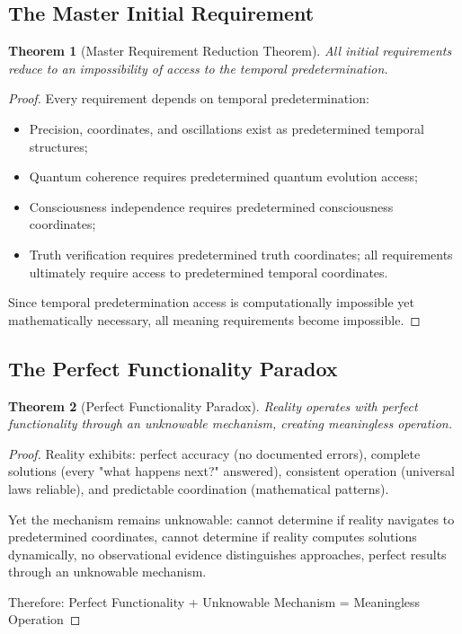 \documentclass[12pt,a4paper]{article}
\newtheorem{theorem}{Theorem}[section]
\begin{document}
\subsection{The Master Initial Requirement}

\begin{theorem}[Master Requirement Reduction Theorem]
All initial requirements reduce to an impossibility of access to the temporal predetermination.
\end{theorem}

\begin{proof}
Every requirement depends on temporal predetermination:
\begin{itemize}
    \item Precision, coordinates, and oscillations exist as predetermined temporal structures;
    \item Quantum coherence requires predetermined quantum evolution access;
    \item Consciousness independence requires predetermined consciousness coordinates;
    \item Truth verification requires predetermined truth coordinates; all requirements ultimately require access to predetermined temporal coordinates.
\end{itemize}
Since temporal predetermination access is computationally impossible yet mathematically necessary, all meaning requirements become impossible.
\end{proof}


\subsection{The Perfect Functionality Paradox}

\begin{theorem}[Perfect Functionality Paradox]
Reality operates with perfect functionality through an unknowable mechanism, creating meaningless operation.
\end{theorem}

\begin{proof}
Reality exhibits: perfect accuracy (no documented errors), complete solutions (every "what happens next?" answered), consistent operation (universal laws reliable), and predictable coordination (mathematical patterns).

Yet the mechanism remains unknowable: cannot determine if reality navigates to predetermined coordinates, cannot determine if reality computes solutions dynamically, no observational evidence distinguishes approaches, perfect results through an unknowable mechanism.

Therefore: Perfect Functionality + Unknowable Mechanism = Meaningless Operation
\end{proof}
\end{document}
